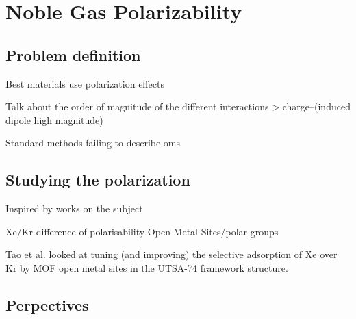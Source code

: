 \documentclass[main]{subfiles}
\begin{document}
\section{Noble Gas Polarizability}

\subsection{Problem definition}

Best materials use polarization effects \autocite{Li_2019,Pei_2022}

Talk about the order of magnitude of the different interactions > charge--(induced dipole high magnitude)

Standard methods failing to describe oms\autocite{Perry_2014} 





\subsection{Studying the polarization}

Inspired by works on the subject\autocite{Lachet_1998,Becker_2017} 


Xe/Kr difference of polarisability
Open Metal Sites/polar groups

Tao et al.\autocite{Tao_2020} looked at tuning (and improving) the selective adsorption of Xe over Kr by MOF open metal sites in the UTSA-74 framework structure.


\subsection{Perpectives}

\OnlyInSubfile{\printglobalbibliography}
\end{document}
